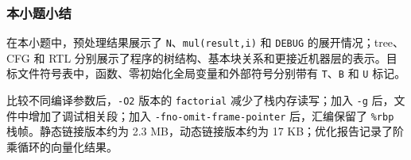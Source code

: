 

\subsubsection{本小题小结}

在本小题中，预处理结果展示了 \texttt{N}、\texttt{mul(result,i)} 和 \texttt{DEBUG} 的展开情况；tree、CFG 和 RTL 分别展示了程序的树结构、基本块关系和更接近机器层的表示。目标文件符号表中，函数、零初始化全局变量和外部符号分别带有 \texttt{T}、\texttt{B} 和 \texttt{U} 标记。

比较不同编译参数后，\texttt{-O2} 版本的 \texttt{factorial} 减少了栈内存读写；加入 \texttt{-g} 后，文件中增加了调试相关段；加入 \texttt{-fno-omit-frame-pointer} 后，汇编保留了 \texttt{\%rbp} 栈帧。静态链接版本约为 2.3 MB，动态链接版本约为 17 KB；优化报告记录了阶乘循环的向量化结果。

